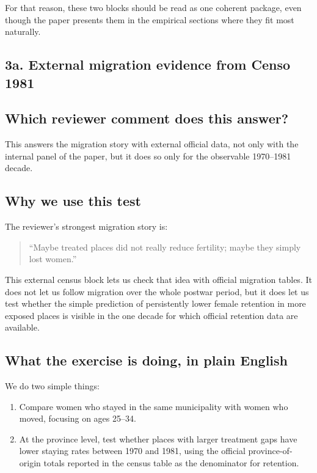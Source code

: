 \documentclass[11pt]{article}
\begin{document}
For that reason, these two blocks should be read as one coherent package, even though the paper presents them in the empirical sections where they fit most naturally.

\subsection*{3a. External migration evidence from Censo 1981}\label{sec:migration-3a}

\subsection*{Which reviewer comment does this answer?}

This answers the migration story with external official data, not only with the internal panel of the paper, but it does so only for the observable 1970--1981 decade.

\subsection*{Why we use this test}

The reviewer's strongest migration story is:

\begin{quote}
``Maybe treated places did not really reduce fertility; maybe they simply lost women.''
\end{quote}

This external census block lets us check that idea with official migration tables. It does not let us follow migration over the whole postwar period, but it does let us test whether the simple prediction of persistently lower female retention in more exposed places is visible in the one decade for which official retention data are available.

\subsection*{What the exercise is doing, in plain English}

We do two simple things:
\begin{enumerate}[leftmargin=*]
\item Compare women who stayed in the same municipality with women who moved, focusing on ages 25--34.
\item At the province level, test whether places with larger treatment gaps have lower staying rates between 1970 and 1981, using the official province-of-origin totals reported in the census table as the denominator for retention.
\end{enumerate}
\end{document}
